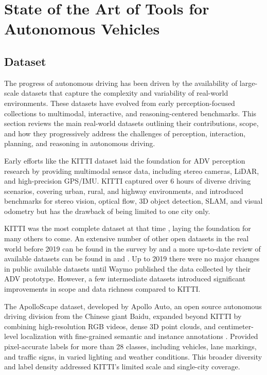 \chapter{State of the Art of Tools for Autonomous Vehicles} \label{sec:related-work}

\section{Dataset}

The progress of autonomous driving has been driven by the availability of large-scale datasets that capture the complexity and variability of real-world environments. These datasets have evolved from early perception-focused collections to multimodal, interactive, and reasoning-centered benchmarks. This section reviews the main real-world datasets outlining their contributions, scope, and how they progressively address the challenges of perception, interaction, planning, and reasoning in autonomous driving.

Early efforts like the KITTI dataset \cite{geiger2013} laid the foundation for ADV perception research by providing multimodal sensor data, including stereo cameras, LiDAR, and high-precision GPS/IMU. KITTI captured over 6 hours of diverse driving scenarios, covering urban, rural, and highway environments, and introduced benchmarks for stereo vision, optical flow, 3D object detection, SLAM, and visual odometry\cite{geiger2012,geiger2013} but has the drawback of being limited to one city only.

KITTI was the most complete dataset at that time \cite{kang2019}, laying the foundation for many others to come. An extensive number of other open datasets in the real world before 2019 can be found in the survey by \cite{kang2019} and a more up-to-date review of available datasets can be found in \cite{liu2021} and \cite{liu2024}. Up to 2019 there were no major changes in public available datasets until Waymo published the data collected by their ADV prototype. However, a few intermediate datasets introduced significant improvements in scope and data richness compared to KITTI.

The ApolloScape dataset, developed by Apollo Auto, an open source autonomous driving division from the Chinese giant Baidu, expanded beyond KITTI by combining high-resolution RGB videos, dense 3D point clouds, and centimeter-level localization with fine-grained semantic and instance annotations \cite{Huang_2018_CVPR_Workshops}. Provided pixel-accurate labels for more than 28 classes, including vehicles, lane markings, and traffic signs, in varied lighting and weather conditions. This broader diversity and label density addressed KITTI’s limited scale and single-city coverage.

